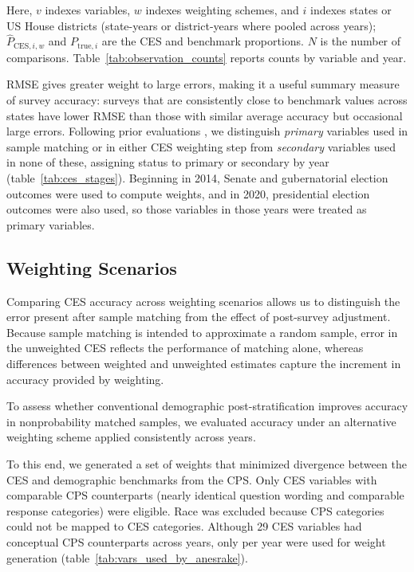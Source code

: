 \documentclass[12pt]{article}
\begin{document}
Here, $v$ indexes variables, $w$ indexes weighting schemes, and $i$ indexes states or US House districts (state-years or district-years where pooled across years); $\widehat{P}_{\mathrm{CES},i,w}$ and $P_{\mathrm{true},i}$ are the CES and benchmark proportions. $N$ is the number of comparisons. Table~\ref{tab:observation_counts} reports counts by variable and year.


RMSE gives greater weight to large errors, making it a useful summary measure of survey accuracy: surveys that are consistently close to benchmark values across states have lower RMSE than those with similar average accuracy but occasional large errors. Following prior evaluations \parencite{yeager_comparing_2011, macinnis_accuracy_2018}, we distinguish \textit{primary} variables used in sample matching or in either CES weighting step from \textit{secondary} variables used in none of these, assigning status to primary or secondary by year (table~\ref{tab:ces_stages}). Beginning in 2014, Senate and gubernatorial election outcomes were used to compute weights, and in 2020, presidential election outcomes were also used, so those variables in those years were treated as primary variables.

\subsection{Weighting Scenarios}
Comparing CES accuracy across weighting scenarios allows us to distinguish the error present after sample matching from the effect of post-survey adjustment. Because sample matching is intended to approximate a random sample, error in the unweighted CES reflects the performance of matching alone, whereas differences between weighted and unweighted estimates capture the increment in accuracy provided by weighting.

To assess whether conventional demographic post-stratification improves accuracy in nonprobability matched samples, we evaluated accuracy under an alternative weighting scheme applied consistently across years.

To this end, we generated a set of weights that minimized divergence between the CES and demographic benchmarks from the CPS. Only CES variables with comparable CPS counterparts (nearly identical question wording and comparable response categories) were eligible. Race was excluded because CPS categories could not be mapped to CES categories. Although 29 CES variables had conceptual CPS counterparts across years, only \AnesrakeUsedRange{} per year were used for weight generation (table~\ref{tab:vars_used_by_anesrake}).
\end{document}
